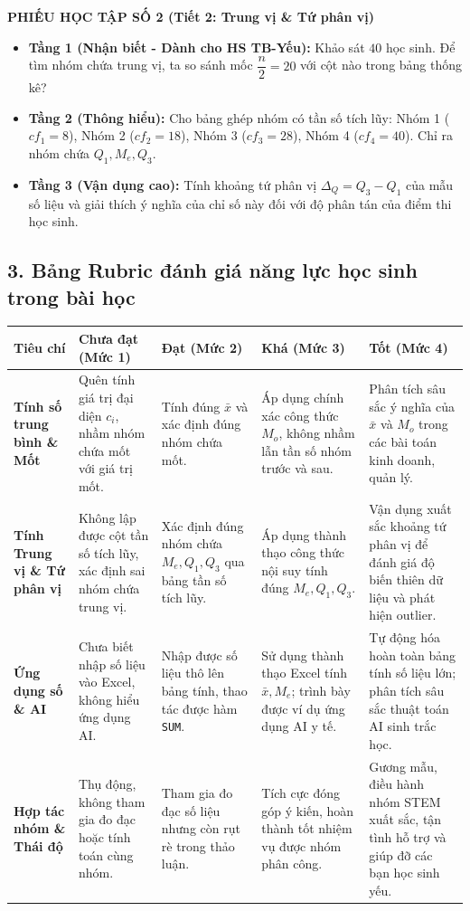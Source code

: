 \documentclass[12pt, a4paper]{article}
\begin{document}
\vspace{5pt}
\noindent \textbf{PHIẾU HỌC TẬP SỐ 2 (Tiết 2: Trung vị \& Tứ phân vị)}
\begin{itemize}[leftmargin=0.6cm]
    \item \textbf{Tầng 1 (Nhận biết - Dành cho HS TB-Yếu):} Khảo sát $40$ học sinh. Để tìm nhóm chứa trung vị, ta so sánh mốc $\dfrac{n}{2} = 20$ với cột nào trong bảng thống kê?
    \item \textbf{Tầng 2 (Thông hiểu):} Cho bảng ghép nhóm có tần số tích lũy: Nhóm 1 ($cf_1 = 8$), Nhóm 2 ($cf_2 = 18$), Nhóm 3 ($cf_3 = 28$), Nhóm 4 ($cf_4 = 40$). Chỉ ra nhóm chứa $Q_1, M_e, Q_3$.
    \item \textbf{Tầng 3 (Vận dụng cao):} Tính khoảng tứ phân vị $\Delta_Q = Q_3 - Q_1$ của mẫu số liệu và giải thích ý nghĩa của chỉ số này đối với độ phân tán của điểm thi học sinh.
\end{itemize}

\subsection*{3. Bảng Rubric đánh giá năng lực học sinh trong bài học}

\begin{center}
\small
\begin{tabularx}{\textwidth}{|p{2.8cm}|X|X|X|X|}
\hline
\textbf{Tiêu chí} & \textbf{Chưa đạt (Mức 1)} & \textbf{Đạt (Mức 2)} & \textbf{Khá (Mức 3)} & \textbf{Tốt (Mức 4)} \\ \hline
\textbf{Tính số trung bình \& Mốt} & Quên tính giá trị đại diện $c_i$, nhầm nhóm chứa mốt với giá trị mốt. & Tính đúng $\bar{x}$ và xác định đúng nhóm chứa mốt. & Áp dụng chính xác công thức $M_o$, không nhầm lẫn tần số nhóm trước và sau. & Phân tích sâu sắc ý nghĩa của $\bar{x}$ và $M_o$ trong các bài toán kinh doanh, quản lý. \\ \hline
\textbf{Tính Trung vị \& Tứ phân vị} & Không lập được cột tần số tích lũy, xác định sai nhóm chứa trung vị. & Xác định đúng nhóm chứa $M_e, Q_1, Q_3$ qua bảng tần số tích lũy. & Áp dụng thành thạo công thức nội suy tính đúng $M_e, Q_1, Q_3$. & Vận dụng xuất sắc khoảng tứ phân vị để đánh giá độ biến thiên dữ liệu và phát hiện outlier. \\ \hline
\textbf{Ứng dụng số \& AI} & Chưa biết nhập số liệu vào Excel, không hiểu ứng dụng AI. & Nhập được số liệu thô lên bảng tính, thao tác được hàm \texttt{SUM}. & Sử dụng thành thạo Excel tính $\bar{x}, M_e$; trình bày được ví dụ ứng dụng AI y tế. & Tự động hóa hoàn toàn bảng tính số liệu lớn; phân tích sâu sắc thuật toán AI sinh trắc học. \\ \hline
\textbf{Hợp tác nhóm \& Thái độ} & Thụ động, không tham gia đo đạc hoặc tính toán cùng nhóm. & Tham gia đo đạc số liệu nhưng còn rụt rè trong thảo luận. & Tích cực đóng góp ý kiến, hoàn thành tốt nhiệm vụ được nhóm phân công. & Gương mẫu, điều hành nhóm STEM xuất sắc, tận tình hỗ trợ và giúp đỡ các bạn học sinh yếu. \\ \hline
\end{tabularx}
\end{center}
\end{document}
